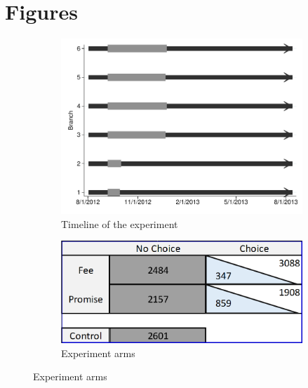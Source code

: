 \documentclass[oneside,11pt]{article}
\begin{document}

\section{Figures}


\begin{figure}[H]
     \caption{Experiment description}
    \label{exp_description}
    \begin{center}
    \begin{subfigure}{.40\textwidth}
      \caption{Timeline of the experiment}
        \centering
        \includegraphics[width=\textwidth]{Figuras/timeline_suc_exp_extended.pdf}
    \end{subfigure}
    \begin{subfigure}{0.40\textwidth}
    \caption{Experiment arms}
       \centering
      \includegraphics[width=\textwidth]{Figuras/exp_arms.PNG}
    \end{subfigure}
    \end{center}

\end{figure}
\end{document}
